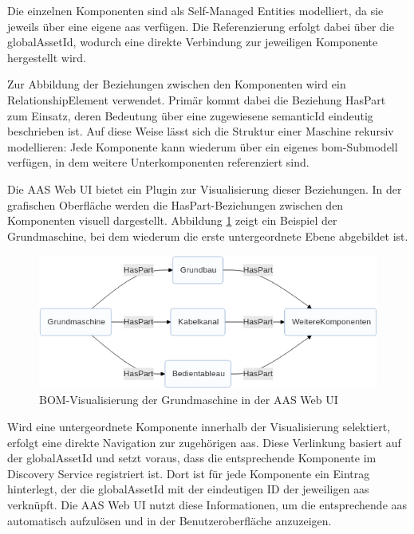 Die einzelnen Komponenten sind als Self-Managed Entities modelliert, da sie jeweils über eine eigene \acs{aas} verfügen.
Die Referenzierung erfolgt dabei über die globalAssetId, wodurch eine direkte Verbindung zur jeweiligen Komponente hergestellt wird.

Zur Abbildung der Beziehungen zwischen den Komponenten wird ein RelationshipElement verwendet.
Primär kommt dabei die Beziehung HasPart zum Einsatz, deren Bedeutung über eine zugewiesene semanticId eindeutig beschrieben ist.
Auf diese Weise lässt sich die Struktur einer Maschine rekursiv modellieren: Jede Komponente kann wiederum über ein eigenes \acs{bom}-Submodell verfügen, in dem weitere Unterkomponenten referenziert sind.

Die AAS Web UI bietet ein Plugin zur Visualisierung dieser Beziehungen. 
In der grafischen Oberfläche werden die HasPart-Beziehungen zwischen den Komponenten visuell dargestellt. 
Abbildung \ref{fig:BOMVisualisierungUI} zeigt ein Beispiel der Grundmaschine, bei dem wiederum die erste untergeordnete Ebene abgebildet ist.

\begin{figure}[htbp]
    \centering
        \includegraphics{Bilder/Ergebnisse/StatischeDaten/BOMVisualisierungUIpng.png}
    \caption{BOM-Visualisierung der Grundmaschine in der AAS Web UI}
    \label{fig:BOMVisualisierungUI}
\end{figure}

Wird eine untergeordnete Komponente innerhalb der Visualisierung selektiert, erfolgt eine direkte Navigation zur zugehörigen \acs{aas}. 
Diese Verlinkung basiert auf der globalAssetId und setzt voraus, dass die entsprechende Komponente im Discovery Service registriert ist. 
Dort ist für jede Komponente ein Eintrag hinterlegt, der die globalAssetId mit der eindeutigen ID der jeweiligen \acs{aas} verknüpft. 
Die AAS Web UI nutzt diese Informationen, um die entsprechende \acs{aas} automatisch aufzulösen und in der Benutzeroberfläche anzuzeigen.

